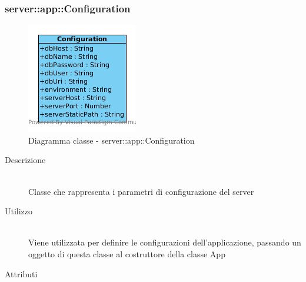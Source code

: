 \vspace{0.5cm}
\hypertarget{server::app::Configuration}{}
\subsubsection[Configuration]{server::app::Configuration}
\begin{center}
			\begin{figure}[H]
				\centering \includegraphics[scale=4, max width=\textwidth, max height=\myheight]{../img/diagrammiClassi/server/app/Configuration.png}
				\caption{Diagramma classe - server::app::Configuration}
			\end{figure}
		\end{center}\begin{description}
\item[Descrizione] \hfill \\
 Classe che rappresenta i parametri di configurazione del server
\item[Utilizzo] \hfill \\
 Viene utilizzata per definire le configurazioni dell'applicazione, passando un oggetto di questa classe al costruttore della classe App
\item[Attributi] \hfill \\
 \vspace{-7mm}
\begin{itemize}

\end{itemize}
\end{description}
